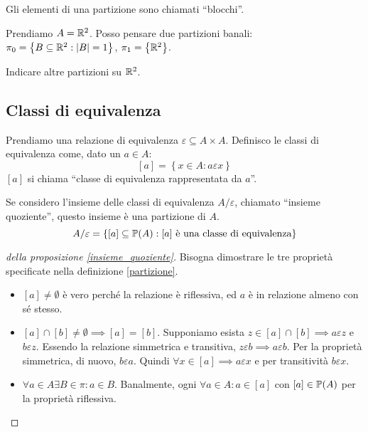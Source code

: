 Gli elementi di una partizione sono chiamati ``blocchi''.

Prendiamo $A = \mathbb{R}^2$. Posso pensare due partizioni banali: $\pi_0 = \left\{ B \subseteq \mathbb{R}^2 : \left\lvert{B}\right\rvert = 1 \right\}$, $\pi_1 = \left\{ \mathbb{R}^2 \right \}$.

\begin{esercizio}
Indicare altre partizioni su $\mathbb{R}^2$.
\end{esercizio}

\subsection{Classi di equivalenza}
\begin{defn}
Prendiamo una relazione di equivalenza $\varepsilon \subseteq A \times A$. Definisco le classi di equivalenza come, dato un $a \in A$:
\[
[a] = \left \{ x \in A : a \varepsilon x \right\}
\]
$[a]$ si chiama ``classe di equivalenza rappresentata da $a$''.
\end{defn}
\begin{prop}
Se considero l'insieme delle classi di equivalenza $A / \varepsilon$, chiamato ``insieme quoziente'', questo insieme \`e una partizione di $A$.
\[
A/\varepsilon = \left\{ [a] \subseteq \mathbb{P}(A) : [a] \text{ \`e una classe di equivalenza} \right\}
\]
\end{prop}
\begin{proof}[della proposizione \ref{insieme_quoziente}]
Bisogna dimostrare le tre propriet\`a specificate nella definizione \ref{partizione}.
\begin{itemize}
  \item $[a] \neq \emptyset$ \`e vero perch\'e la relazione \`e riflessiva, ed $a$ \`e in relazione almeno con s\'e stesso.
  \item $[a] \cap [b] \neq \emptyset \implies [a] = [b]$. Supponiamo esista $z \in [a] \cap [b] \implies a \varepsilon z$ e $b \varepsilon z$. Essendo la relazione simmetrica e transitiva, $z \varepsilon b \implies a \varepsilon b$. Per la propriet\`a simmetrica, di nuovo, $b \varepsilon a$. Quindi $ \forall x \in [a] \implies a \varepsilon x $ e per transitivit\`a $ b \varepsilon x$.
  \item $\forall a \in A \exists B \in \pi : a \in B$. Banalmente, ogni $\forall a \in A : a \in [a]$ con $[a] \in \mathbb{P}(A)$ per la propriet\`a riflessiva.
\end{itemize}
\end{proof}

